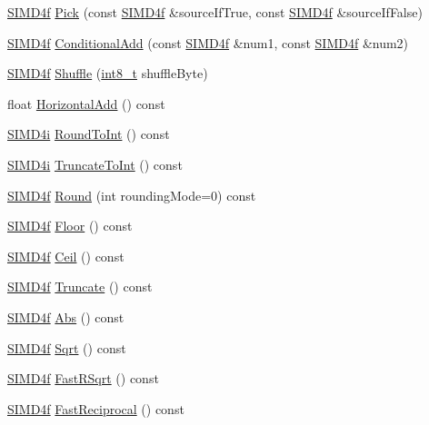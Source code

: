 \begin{DoxyCompactItemize}
\item 
\hyperlink{class_s_i_m_d4f}{S\+I\+M\+D4f} \hyperlink{class_s_i_m_d4f_a2eb197707b1e028665b4ab5399b98e58}{Pick} (const \hyperlink{class_s_i_m_d4f}{S\+I\+M\+D4f} \&source\+If\+True, const \hyperlink{class_s_i_m_d4f}{S\+I\+M\+D4f} \&source\+If\+False)
\item 
\hyperlink{class_s_i_m_d4f}{S\+I\+M\+D4f} \hyperlink{class_s_i_m_d4f_a076452ebd64a5f9321250fca245cbfbc}{Conditional\+Add} (const \hyperlink{class_s_i_m_d4f}{S\+I\+M\+D4f} \&num1, const \hyperlink{class_s_i_m_d4f}{S\+I\+M\+D4f} \&num2)
\item 
\hyperlink{class_s_i_m_d4f}{S\+I\+M\+D4f} \hyperlink{class_s_i_m_d4f_ad295a893eafcfd63abb66cda02192ad0}{Shuffle} (\hyperlink{simddefines_8h_aef44329758059c91c76d334e8fc09700}{int8\+\_\+t} shuffle\+Byte)
\item 
float \hyperlink{class_s_i_m_d4f_a817d0e6bbe46b7dd609188ee73448218}{Horizontal\+Add} () const 
\item 
\hyperlink{class_s_i_m_d4i}{S\+I\+M\+D4i} \hyperlink{class_s_i_m_d4f_afdead05a92f34598d362975c7ec1661c}{Round\+To\+Int} () const 
\item 
\hyperlink{class_s_i_m_d4i}{S\+I\+M\+D4i} \hyperlink{class_s_i_m_d4f_af3630cd24a3be6ca8485d858a1306440}{Truncate\+To\+Int} () const 
\item 
\hyperlink{class_s_i_m_d4f}{S\+I\+M\+D4f} \hyperlink{class_s_i_m_d4f_a6aae2c276b8194b8d3c8ff4c9f6c619e}{Round} (int rounding\+Mode=0) const 
\item 
\hyperlink{class_s_i_m_d4f}{S\+I\+M\+D4f} \hyperlink{class_s_i_m_d4f_a6687bf362a488251b8c5c495cfb2a385}{Floor} () const 
\item 
\hyperlink{class_s_i_m_d4f}{S\+I\+M\+D4f} \hyperlink{class_s_i_m_d4f_a8eec4c908f66003bb8bf1067a6c59bba}{Ceil} () const 
\item 
\hyperlink{class_s_i_m_d4f}{S\+I\+M\+D4f} \hyperlink{class_s_i_m_d4f_a80d9698aefb6ddcefde55b077ee22e2e}{Truncate} () const 
\item 
\hyperlink{class_s_i_m_d4f}{S\+I\+M\+D4f} \hyperlink{class_s_i_m_d4f_a57b0c4d2e3dee7a7463040c76f9d34bd}{Abs} () const 
\item 
\hyperlink{class_s_i_m_d4f}{S\+I\+M\+D4f} \hyperlink{class_s_i_m_d4f_a510350c7a4ed579fd9c143bd059e6e05}{Sqrt} () const 
\item 
\hyperlink{class_s_i_m_d4f}{S\+I\+M\+D4f} \hyperlink{class_s_i_m_d4f_a40f4dbbc2538ba8bd8d92c18e617ee59}{Fast\+R\+Sqrt} () const 
\item 
\hyperlink{class_s_i_m_d4f}{S\+I\+M\+D4f} \hyperlink{class_s_i_m_d4f_aee80a83cd05cbfe0062b4d6935d2d7b8}{Fast\+Reciprocal} () const 

\end{DoxyCompactItemize}
